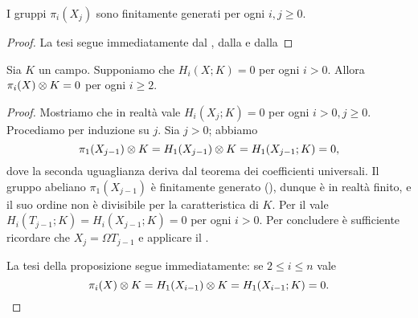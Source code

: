 \begin{corollary}
I gruppi \(\pi_i(X_j)\) sono finitamente generati per ogni \(i,j\ge 0\).
\end{corollary}
\begin{proof}
La tesi segue immediatamente dal , dalla  e dalla 
\end{proof}

\begin{proposition}
Sia \(K\) un campo. Supponiamo che \(H_i(X;K)=0\) per ogni \(i>0\). Allora \(\pi_i(X)\mathbin{\otimes} K=0\) per ogni \(i\ge 2\).
\end{proposition}
\begin{proof}
Mostriamo che in realtà vale \(H_i(X_j;K)=0\) per ogni \(i>0,j\ge 0\). Procediamo per induzione su \(j\). Sia \(j>0\); abbiamo
\[
\pi_1(X_{j-1})\mathbin{\otimes} K=H_1(X_{j-1})\mathbin{\otimes} K=H_1(X_{j-1};K)=0,
\]
dove la seconda uguaglianza deriva dal teorema dei coefficienti universali. Il gruppo abeliano \(\pi_1(X_{j-1})\) è finitamente generato (), dunque è in realtà finito, e il suo ordine non è divisibile per la caratteristica di \(K\). Per il  vale \(H_i(T_{j-1};K)=H_i(X_{j-1};K)=0\) per ogni \(i>0\). Per concludere è sufficiente ricordare che \(X_j=\Omega T_{j-1}\) e applicare il .

La tesi della proposizione segue immediatamente: se \(2\le i\le n\) vale
\[
\pi_i(X)\mathbin{\otimes} K=H_1(X_{i-1})\mathbin{\otimes} K=H_1(X_{i-1};K)=0.\qedhere
\]
\end{proof}

